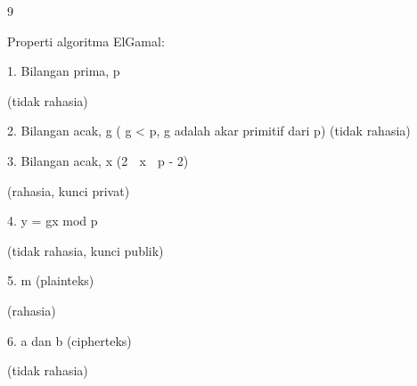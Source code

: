 \documentclass{article}
\begin{document}

9

Properti algoritma ElGamal:

1.  Bilangan prima, p 


(tidak rahasia)

2.  Bilangan acak, g  ( g < p, g adalah akar primitif dari p)  (tidak rahasia)

3. Bilangan acak, x  (2  x  p - 2) 

(rahasia, kunci privat)

4.  y = gx mod p 



(tidak rahasia, kunci publik)

5.  m   (plainteks)  


(rahasia)

6.  a dan b  (cipherteks)  

(tidak rahasia)
\end{document}
